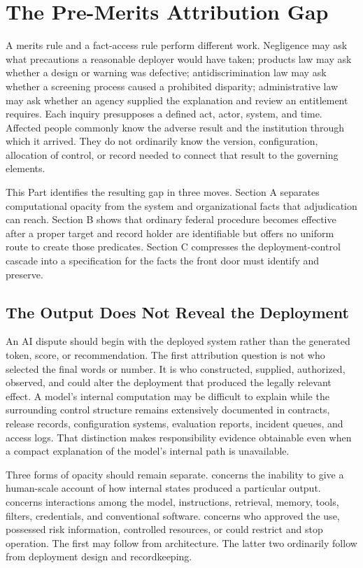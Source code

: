 \section{The Pre-Merits Attribution Gap}
\label{sec:gap}

A merits rule and a fact-access rule perform different work. Negligence may ask what precautions a reasonable deployer would have taken; products law may ask whether a design or warning was defective; antidiscrimination law may ask whether a screening process caused a prohibited disparity; administrative law may ask whether an agency supplied the explanation and review an entitlement requires. Each inquiry presupposes a defined act, actor, system, and time. Affected people commonly know the adverse result and the institution through which it arrived. They do not ordinarily know the version, configuration, allocation of control, or record needed to connect that result to the governing elements.

This Part identifies the resulting gap in three moves. Section A separates computational opacity from the system and organizational facts that adjudication can reach. Section B shows that ordinary federal procedure becomes effective after a proper target and record holder are identifiable but offers no uniform route to create those predicates. Section C compresses the deployment-control cascade into a specification for the facts the front door must identify and preserve.

\subsection{The Output Does Not Reveal the Deployment}

An AI dispute should begin with the deployed system rather than the generated token, score, or recommendation. The first attribution question is not who selected the final words or number. It is who constructed, supplied, authorized, observed, and could alter the deployment that produced the legally relevant effect. A model's internal computation may be difficult to explain while the surrounding control structure remains extensively documented in contracts, release records, configuration systems, evaluation reports, incident queues, and access logs. That distinction makes responsibility evidence obtainable even when a compact explanation of the model's internal path is unavailable.

Three forms of opacity should remain separate.  concerns the inability to give a human-scale account of how internal states produced a particular output.  concerns interactions among the model, instructions, retrieval, memory, tools, filters, credentials, and conventional software.  concerns who approved the use, possessed risk information, controlled resources, or could restrict and stop operation. The first may follow from architecture. The latter two ordinarily follow from deployment design and recordkeeping.

